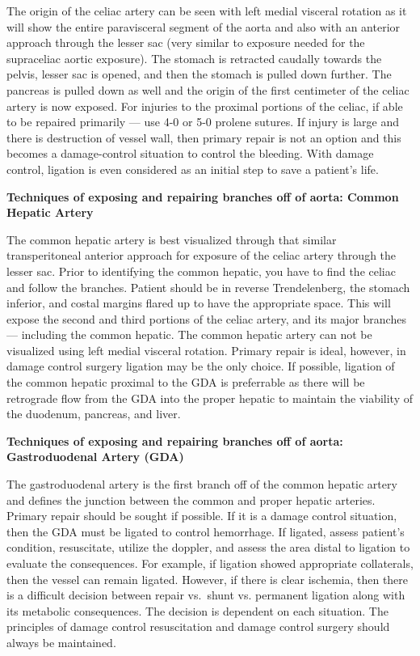 \documentclass[
]{book}
\begin{document}
The origin of the celiac artery can be seen with left medial visceral
rotation as it will show the entire paravisceral segment of the aorta
and also with an anterior approach through the lesser sac (very similar
to exposure needed for the supraceliac aortic exposure). The stomach is
retracted caudally towards the pelvis, lesser sac is opened, and then
the stomach is pulled down further. The pancreas is pulled down as well
and the origin of the first centimeter of the celiac artery is now
exposed. For injuries to the proximal portions of the celiac, if able to
be repaired primarily --- use 4-0 or 5-0 prolene sutures. If injury is
large and there is destruction of vessel wall, then primary repair is
not an option and this becomes a damage-control situation to control the
bleeding. With damage control, ligation is even considered as an initial
step to save a patient's life.

\textbf{Techniques of exposing and repairing branches off of aorta: Common
Hepatic Artery}

The common hepatic artery is best visualized through that similar
transperitoneal anterior approach for exposure of the celiac artery
through the lesser sac. Prior to identifying the common hepatic, you
have to find the celiac and follow the branches. Patient should be in
reverse Trendelenberg, the stomach inferior, and costal margins flared
up to have the appropriate space. This will expose the second and third
portions of the celiac artery, and its major branches --- including the
common hepatic. The common hepatic artery can not be visualized using
left medial visceral rotation. Primary repair is ideal, however, in
damage control surgery ligation may be the only choice. If possible,
ligation of the common hepatic proximal to the GDA is preferrable as
there will be retrograde flow from the GDA into the proper hepatic to
maintain the viability of the duodenum, pancreas, and liver.

\textbf{Techniques of exposing and repairing branches off of aorta:
Gastroduodenal Artery (GDA)}

The gastroduodenal artery is the first branch off of the common hepatic
artery and defines the junction between the common and proper hepatic
arteries. Primary repair should be sought if possible. If it is a damage
control situation, then the GDA must be ligated to control hemorrhage.
If ligated, assess patient's condition, resuscitate, utilize the
doppler, and assess the area distal to ligation to evaluate the
consequences. For example, if ligation showed appropriate collaterals,
then the vessel can remain ligated. However, if there is clear ischemia,
then there is a difficult decision between repair vs.~shunt vs.
permanent ligation along with its metabolic consequences. The decision
is dependent on each situation. The principles of damage control
resuscitation and damage control surgery should always be maintained.
\end{document}
